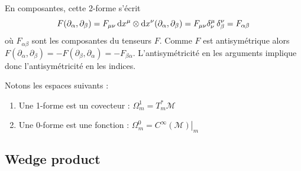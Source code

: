En composantes, cette 2-forme s'écrit
\begin{equation}
    F(\partial_{\alpha}, \partial_{\beta}) = F_{\mu \nu}\, \mathrm{d} x^{\mu}\otimes \mathrm{d} x^{\nu}(\partial_{\alpha}, \partial_{\beta}) = F_{\mu \nu} \delta^{\mu}_{\nu}\,\delta^{\nu}_{\beta } = F_{\alpha \beta}
\end{equation}
où $F_{\alpha \beta}$ sont les composantes du tenseurs $F$. Comme $F$ est antisymétrique alors $F(\partial_{\alpha}, \partial_{\beta}) = -F(\partial_{\beta}, \partial_{\alpha}) = -F_{ \beta \alpha}$. L'antisymétricité en les arguments implique donc l'antisymétricité en les indices.
\begin{rmk}
    Notons les espaces suivants :
    \begin{enumerate}
        \item Une 1-forme est un covecteur : $\Omega_m^1 = T_m^*\mathcal{M}$
        \item Une 0-forme est une fonction : $\Omega_m^0 = \left. C^\infty(\mathcal{M}) \right|_m$
    \end{enumerate}
\end{rmk}

\subsection{Wedge product}

